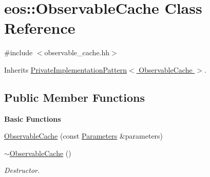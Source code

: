 \hypertarget{classeos_1_1ObservableCache}{
\section{eos::ObservableCache Class Reference}
\label{classeos_1_1ObservableCache}
}


{\ttfamily \#include $<$observable\_\-cache.hh$>$}

Inherits \hyperlink{classeos_1_1PrivateImplementationPattern}{PrivateImplementationPattern$<$ ObservableCache $>$}.\subsection*{Public Member Functions}
\begin{Indent}{\bf Basic Functions}\par
{\em \label{_amgrp2386c9a1f1785edee33f374dd2db9b3d}
 }\begin{DoxyCompactItemize}
\item 
\hyperlink{classeos_1_1ObservableCache_afc29264c67c8404ab659ab3ebce0677a}{ObservableCache} (const \hyperlink{classeos_1_1Parameters}{Parameters} \&parameters)
\item 
\hyperlink{classeos_1_1ObservableCache_aee7b3cb68fe74a44faff0fed5547830d}{$\sim$ObservableCache} ()
\begin{DoxyCompactList}\small\item\em Destructor. \item\end{DoxyCompactList}\end{DoxyCompactItemize}
\end{Indent}
